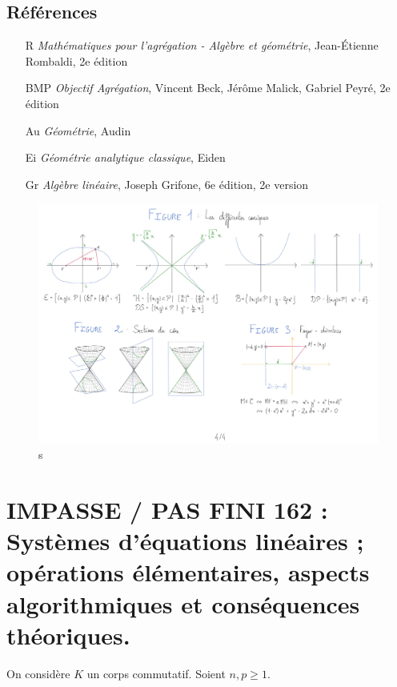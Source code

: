 \documentclass[10pt, a4paper, parskip=full, twoside, twocolumn]{report}
\begin{document}
\section*{Références}
\begin{itemize}
	\item[R] \emph{Mathématiques pour l'agrégation - Algèbre et géométrie}, Jean-Étienne Rombaldi, 2e édition
	\item[BMP] \emph{Objectif Agrégation}, Vincent Beck, Jérôme Malick, Gabriel Peyré, 2e édition
	\item[Au] \emph{Géométrie}, Audin
	\item[Ei] \emph{Géométrie analytique classique}, Eiden
	\item[Gr] \emph{Algèbre linéaire}, Joseph Grifone, 6e édition, 2e version
\end{itemize}

\begin{figure}[!htb]
	\centering
	\includegraphics[trim={0 0 0 0},clip,width=1\linewidth]{img/171.pdf}
	\caption{s}
\end{figure}


\chapter*{IMPASSE / PAS FINI 162 : Systèmes d'équations linéaires ; opérations élémentaires, aspects algorithmiques et conséquences théoriques.}
\setcounter{definition}{0}

\textcolor{paragraphtext}{On considère $K$ un corps commutatif. Soient $n,p\geq 1$.}
\end{document}
